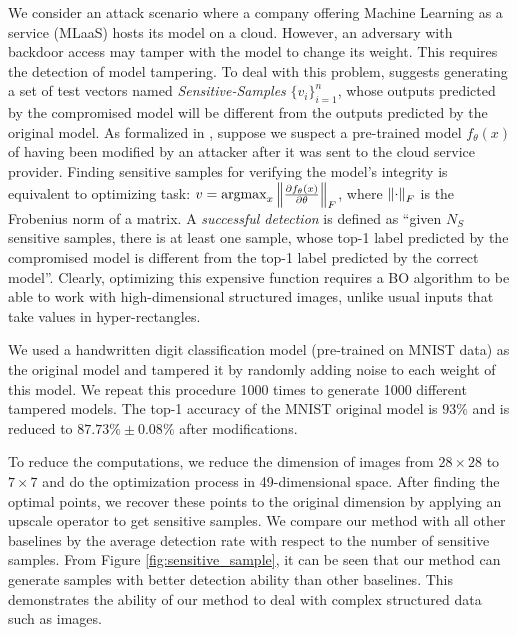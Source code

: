 We consider an attack scenario where a company offering Machine Learning as a service (MLaaS) hosts its model on a cloud. However, an adversary with backdoor access may tamper with the model to change its weight. This requires the detection of model tampering. To deal with this problem, \citet{he2018verideep} suggests generating a set of test vectors named \emph{Sensitive-Samples} $\{v_i\}_{i=1}^n$, whose outputs predicted by the compromised model will be different from the outputs predicted by the original model. As formalized in \citet{he2018verideep}, suppose we suspect a pre-trained model $f_\theta(x)$ of having been modified by an attacker after it was sent to the cloud service provider. Finding sensitive samples for verifying the model's integrity is equivalent to optimizing task: $v = \operatorname*{argmax}_x \norm{\frac{\partial f_\theta(x)}{\partial \theta}}_F$, where $\norm{\cdot}_F$ is the Frobenius norm of a matrix. A \emph{successful detection} is defined as ``given $N_S$ sensitive samples, there is at least one sample, whose top-1 label predicted by the compromised model is different from the top-1 label predicted by the correct model''. Clearly, optimizing this expensive function requires a BO algorithm to be able to work with high-dimensional structured images, unlike usual inputs that take values in hyper-rectangles.

We used a handwritten digit classification model (pre-trained on MNIST data) as the original model and tampered it by randomly adding noise to each weight of this model. We repeat this procedure 1000 times to generate 1000 different tampered models. The top-1 accuracy of the MNIST original model is $93\%$ and is reduced to $87.73\% \pm 0.08\%$ after modifications.   

To reduce the computations, we reduce the dimension of images from $28 \times 28$ to $7 \times 7$ and do the optimization process in 49-dimensional space. After finding the optimal points, we recover these points to the original dimension by applying an upscale operator to get sensitive samples. We compare our method with all other baselines by the average detection rate with respect to the number of sensitive samples. From Figure \ref{fig:sensitive_sample}, it can be seen that our method can generate  samples with better detection ability than other baselines. This demonstrates the ability of  our method to deal with complex structured data such as images. 

